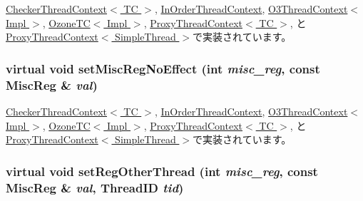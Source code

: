 \hyperlink{classCheckerThreadContext_a1877dde4f3eb17a8b7d33ea40176c148}{CheckerThreadContext$<$ TC $>$}, \hyperlink{classInOrderThreadContext_a1877dde4f3eb17a8b7d33ea40176c148}{InOrderThreadContext}, \hyperlink{classO3ThreadContext_a1877dde4f3eb17a8b7d33ea40176c148}{O3ThreadContext$<$ Impl $>$}, \hyperlink{classOzoneCPU_1_1OzoneTC_a1877dde4f3eb17a8b7d33ea40176c148}{OzoneTC$<$ Impl $>$}, \hyperlink{classProxyThreadContext_a1877dde4f3eb17a8b7d33ea40176c148}{ProxyThreadContext$<$ TC $>$}, と \hyperlink{classProxyThreadContext_a1877dde4f3eb17a8b7d33ea40176c148}{ProxyThreadContext$<$ SimpleThread $>$}で実装されています。\hypertarget{classThreadContext_a2987c1ff22ebdf6cdf354a31462bdbfb}{
\subsubsection[{setMiscRegNoEffect}]{\setlength{\rightskip}{0pt plus 5cm}virtual void setMiscRegNoEffect (int {\em misc\_\-reg}, \/  const {\bf MiscReg} \& {\em val})}}
\label{classThreadContext_a2987c1ff22ebdf6cdf354a31462bdbfb}


\hyperlink{classCheckerThreadContext_a763517aaea2f3decbc1ef9d064216b6f}{CheckerThreadContext$<$ TC $>$}, \hyperlink{classInOrderThreadContext_a763517aaea2f3decbc1ef9d064216b6f}{InOrderThreadContext}, \hyperlink{classO3ThreadContext_a763517aaea2f3decbc1ef9d064216b6f}{O3ThreadContext$<$ Impl $>$}, \hyperlink{classOzoneCPU_1_1OzoneTC_a763517aaea2f3decbc1ef9d064216b6f}{OzoneTC$<$ Impl $>$}, \hyperlink{classProxyThreadContext_a763517aaea2f3decbc1ef9d064216b6f}{ProxyThreadContext$<$ TC $>$}, と \hyperlink{classProxyThreadContext_a763517aaea2f3decbc1ef9d064216b6f}{ProxyThreadContext$<$ SimpleThread $>$}で実装されています。\hypertarget{classThreadContext_a20daffa344b5c94c4bb2b5f8973a72d1}{
\subsubsection[{setRegOtherThread}]{\setlength{\rightskip}{0pt plus 5cm}virtual void setRegOtherThread (int {\em misc\_\-reg}, \/  const {\bf MiscReg} \& {\em val}, \/  {\bf ThreadID} {\em tid})}}
\label{classThreadContext_a20daffa344b5c94c4bb2b5f8973a72d1}


